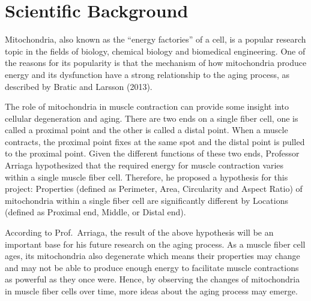 \documentclass{article}\usepackage[]{graphicx}\usepackage[]{color}
\numberwithin{figure}{subsection} %
\numberwithin{table}{subsection} %
\begin{document}
\setcounter{section}{1} %
\setcounter{page}{7}

\section{Scientific Background}
Mitochondria, also known as the ``energy factories'' of a cell, is a popular research topic in the fields of biology, chemical biology and biomedical engineering. One of the reasons for its 
popularity is that the mechanism of how mitochondria produce energy and its dysfunction have a strong relationship to the aging process, as described by Bratic and Larsson (2013).  

The role of mitochondria in muscle contraction can provide some insight into cellular degeneration and aging. There are two ends on a single fiber cell, one is called a proximal point and the other is called a distal point. When a muscle contracts, the proximal point fixes at the same spot and the distal point is pulled to the proximal point. Given the different functions of these two ends, Professor Arriaga hypothesized that the required energy for muscle contraction varies within a single muscle fiber cell. Therefore, he proposed a hypothesis for this project: Properties (defined as Perimeter, Area, Circularity and Aspect Ratio) of mitochondria within a single fiber cell are significantly different by Locations (defined as Proximal end, Middle, or Distal end). 

According to Prof.\ Arriaga, the result of the above hypothesis will be an important base for his future research on the aging process. As a muscle fiber cell ages, its mitochondria also degenerate which means their properties may change and may not be able to produce enough energy to facilitate muscle contractions as powerful as they once were. Hence, by observing the changes of mitochondria in muscle fiber cells over time, more ideas about the aging process may emerge. 
\end{document}
